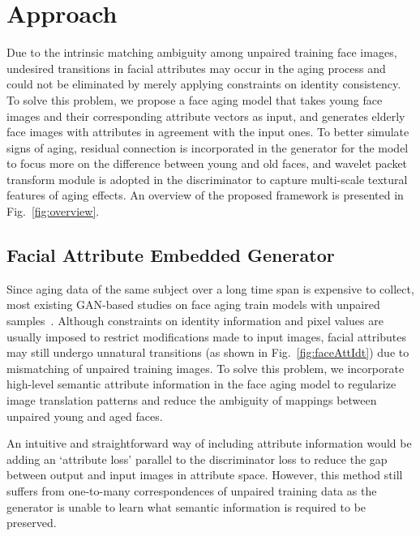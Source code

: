 \documentclass[letterpaper]{article} %
\begin{document}
\section{Approach}

Due to the intrinsic matching ambiguity among unpaired training face images, undesired transitions in facial attributes may occur in the aging process and could not be eliminated by merely applying constraints on identity consistency. 
To solve this problem, we propose a face aging model that takes young face images and their corresponding attribute vectors as input, and generates elderly face images with attributes in agreement with the input ones. 
To better simulate signs of aging, residual connection is incorporated in the generator for the model to focus more on the difference between young and old faces, and wavelet packet transform module is adopted in the discriminator to capture multi-scale textural features of aging effects. An overview of the proposed framework is presented in Fig.~\ref{fig:overview}.

\subsection{Facial Attribute Embedded Generator}
Since aging data of the same subject over a long time span is expensive to collect, most existing GAN-based studies on face aging train models with unpaired samples~\cite{zhang2017age,yang2017learning,li2018global}.
Although constraints on identity information and pixel values are usually imposed to restrict modifications made to input images, facial attributes may still undergo unnatural transitions (as shown in Fig.~\ref{fig:faceAttIdt}) due to mismatching of unpaired training images. 
To solve this problem, we incorporate high-level semantic attribute information in the face aging model to regularize image translation patterns and reduce the ambiguity of mappings between unpaired young and aged faces.

An intuitive and straightforward way of including attribute information would be adding an `attribute loss' parallel to the discriminator loss to reduce the gap between output and input images in attribute space. 
However, this method still suffers from one-to-many correspondences of unpaired training data as the generator is unable to learn what semantic information is required to be preserved.
\end{document}
